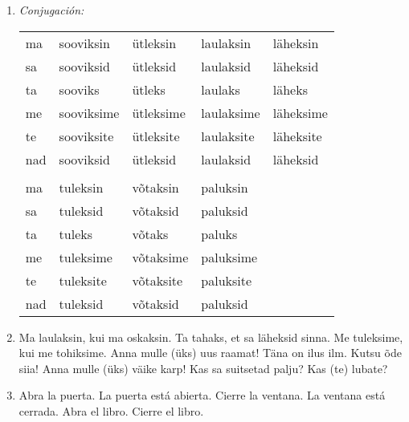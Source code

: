 \begin{enumerate}
	\item \emph{Conjugación:} \\

	\begin{tabular}{ l l l l l }
		ma	& sooviksin 	& ütleksin 	& laulaksin 	& läheksin \\
		sa	& sooviksid 	& ütleksid 	& laulaksid 	& läheksid \\
		ta	& sooviks 		& ütleks 	& laulaks 		& läheks \\	
		me	& sooviksime 	& ütleksime & laulaksime 	& läheksime \\
		te	& sooviksite 	& ütleksite & laulaksite 	& läheksite \\
		nad	& sooviksid 	& ütleksid 	& laulaksid 	& läheksid \\
		& & & & \\ 
		ma 	& tuleksin 		& võtaksin	& paluksin 		& \\
		sa 	& tuleksid 		& võtaksid 	& paluksid 		& \\
		ta 	& tuleks 		& võtaks 	& paluks 		& \\
		me 	& tuleksime 	& võtaksime & paluksime 	& \\
		te 	& tuleksite 	& võtaksite & paluksite 	& \\
		nad & tuleksid 		& võtaksid 	& paluksid 		&  
	\end{tabular}

	\item Ma laulaksin, kui ma oskaksin. Ta tahaks, et sa läheksid sinna. Me tuleksime, kui me tohiksime. Anna mulle (üks) uus raamat! Täna on ilus ilm. Kutsu õde siia! Anna mulle (üks) väike karp! Kas sa suitsetad palju? Kas (te) lubate?

	\item Abra la puerta. La puerta está abierta. Cierre la ventana. La ventana está cerrada. Abra el libro. Cierre el libro.
\end{enumerate}

